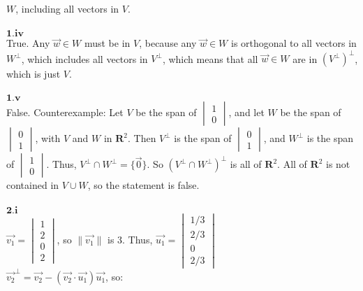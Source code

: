 \documentclass[letterpaper,12pt]{article}
\begin{document}
$W$, including all vectors in $V$.
\\
\\$\mathbf{1.iv}$
\\True. Any $\vec{w} \in W$ must be in $V$, because any $\vec{w} \in W$ is orthogonal to all vectors in $W^{\perp}$, 
which includes all vectors in $V^{\perp}$, which means that all $\vec{w} \in W$ are in $(V^{\perp})^{\perp}$, which is just $V$.
\\
\\$\mathbf{1.v}$
\\False. Counterexample: Let $V$ be the span of $\begin{vmatrix} 1 \\ 0 \end{vmatrix}$, and let $W$ be the span of
$\begin{vmatrix} 0 \\ 1 \end{vmatrix}$, with $V$ and $W$ in $\mathbf{R}^2$.
Then $V^{\perp}$ is the span of $\begin{vmatrix} 0 \\ 1 \end{vmatrix}$, and $W^{\perp}$ is the span of 
$\begin{vmatrix} 1 \\ 0 \end{vmatrix}$. Thus, $V^{\perp} \cap W^{\perp} = \{ \vec{0} \}$.
So $(V^{\perp} \cap W^{\perp})^{\perp}$ is all of $\mathbf{R}^2$. All of $\mathbf{R}^2$ is not contained in
$V \cup W$, so the statement is false.
\\
\\$\mathbf{2.i}$
\\
$\vec{v_1} =
\begin{vmatrix}
1 \\
2 \\
0 \\
2
\end{vmatrix}$, so $\| \vec{v_1} \|$ is $3$. Thus, $\vec{u_1} =
\begin{vmatrix}
1/3 \\
2/3 \\
0 \\
2/3
\end{vmatrix}$
\\$\vec{v_2}^{\perp} = \vec{v_2} - (\vec{v_2} \cdot \vec{u_1}) \vec{u_1}$, so:
\end{document}
